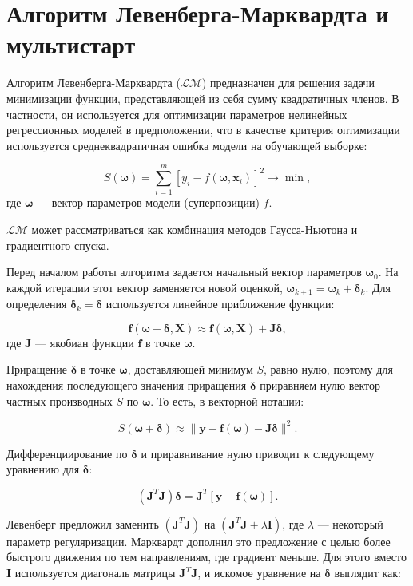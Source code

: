 \documentclass[12pt,a4paper]{amsart}
\begin{document}
\section{Алгоритм Левенберга-Марквардта и мультистарт}

Алгоритм Левенберга-Марквардта ($\mathcal{LM}$) \cite{Marquardt1963Algorithm, more:78}
предназначен для решения задачи минимизации функции, представляющей из себя
сумму квадратичных членов. В частности, он используется для оптимизации
параметров нелинейных регрессионных моделей в предположении, что в качестве
критерия оптимизации используется среднеквадратичная ошибка модели на
обучающей выборке:

\[
S(\boldsymbol{\omega}) = \sum_{i=1}^{m} [y_i - f(\boldsymbol{\omega}, \mathbf{x}_i)]^2 \to \min,
\]
где $\boldsymbol{\omega}$ --- вектор параметров модели (суперпозиции) $f$.

$\mathcal{LM}$ может рассматриваться как комбинация методов Гаусса-Ньютона и
градиентного спуска.

Перед началом работы алгоритма задается начальный вектор параметров $\boldsymbol{\omega}_0$.
На каждой итерации этот вектор заменяется новой оценкой,
$\boldsymbol{\omega}_{k+1} = \boldsymbol{\omega}_k + \boldsymbol{\delta}_k$.
Для определения $\boldsymbol{\delta}_k = \boldsymbol{\delta}$ используется линейное приближение функции:

\[
\mathbf{f(\boldsymbol{\omega} + \boldsymbol{\delta}, X)} \approx
	\mathbf{f(\boldsymbol{\omega}, X)} + \mathbf{J} \boldsymbol{\delta},
\]
где $\mathbf{J}$ --- якобиан функции $\mathbf{f}$ в точке $\boldsymbol{\omega}$.

Приращение $\boldsymbol{\delta}$ в точке $\boldsymbol{\omega}$, доставляющей минимум $S$,
равно нулю, поэтому для нахождения последующего значения приращения $\boldsymbol{\delta}$
приравняем нулю вектор частных производных $S$ по $\boldsymbol{\omega}$. То есть,
в векторной нотации:

\[
S(\mathbf{\boldsymbol{\omega} + \boldsymbol{\delta}}) \approx \| \mathbf{y - f (\boldsymbol{\omega}) - J\boldsymbol{\delta}} \|^2.
\]

Дифференциирование по $\boldsymbol{\delta}$ и приравнивание нулю приводит к
следующему уравнению для $\boldsymbol{\delta}$:

\[
(\mathbf{J}^T\mathbf{J})\boldsymbol{\delta} = \mathbf{J}^T [\mathbf{y - f(\boldsymbol{\omega})}].
\]

Левенберг предложил заменить $(\mathbf{J}^T\mathbf{J})$ на
$(\mathbf{J}^T\mathbf{J} + \lambda\mathbf{I})$, где $\lambda$ --- некоторый
параметр регуляризации. Марквардт дополнил это предложение с целью более
быстрого движения по тем направлениям, где градиент меньше. Для этого вместо
$\mathbf{I}$ используется диагональ матрицы $\mathbf{J}^T\mathbf{J}$, и
искомое уравнение на $\boldsymbol{\delta}$ выглядит как:
\end{document}
